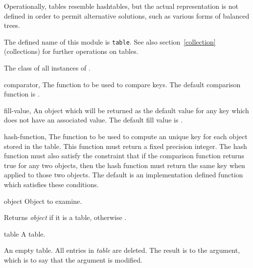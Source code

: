 \label{table}
%
\begin{optRationale}
    Operationally, tables resemble hashtables, but the actual representation is
    not defined in order to permit alternative solutions, such as various forms
    of balanced trees.
\end{optRationale}
%
\begin{optDefinition}
The defined name of this module is {\tt table}.  See also
section~\ref{collection} (collections) for further operations on tables.

%
The class of all instances of .
%
\begin{initoptions}
    \item[comparator, \classref{function}]%
    The function to be used to compare keys.  The default comparison function is
    .

    \item[fill-value, \classref{object}]%
    An object which will be returned as the default value for any key which does
    not have an associated value.  The default fill value is \nil.

    \item[hash-function, \classref{function}]%
    The function to be used to compute an unique key for each object stored in
    the table.  This function must return a fixed precision integer.  The hash
    function must also satisfy the constraint that if the comparison function
    returns true for any two objects, then the hash function must return the
    same key when applied to those two objects.  The default is an
    implementation defined function which satisfies these conditions.
\end{initoptions}

%
\begin{arguments}
    \item[object] Object to examine.
\end{arguments}
%
\result%
Returns {\em object\/} if it is a table, otherwise \nil.

%
\begin{arguments}
    \item[table] A table.
\end{arguments}
%
\result%
An empty table.
%
\remarks%
All entries in {\em table\/} are deleted.  The result is  to the
argument, which is to say that the argument is modified.
%
\end{optDefinition}
